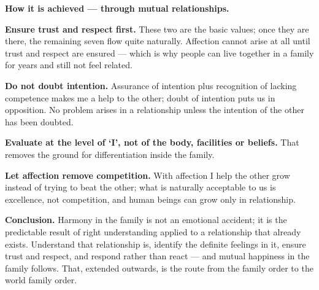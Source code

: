 \textbf{How it is achieved --- through mutual relationships.}

\begin{abul}
\item \textbf{Ensure trust and respect first.} These two are the basic values;
      once they are there, the remaining seven flow quite naturally. Affection
      cannot arise at all until trust and respect are ensured --- which is why
      people can live together in a family for years and still not feel
      related.
\item \textbf{Do not doubt intention.} Assurance of intention plus recognition
      of lacking competence makes me a help to the other; doubt of intention
      puts us in opposition. No problem arises in a relationship unless the
      intention of the other has been doubted.
\item \textbf{Evaluate at the level of `I', not of the body, facilities or
      beliefs.} That removes the ground for differentiation inside the family.
\item \textbf{Let affection remove competition.} With affection I help the
      other grow instead of trying to beat the other; what is naturally
      acceptable to us is excellence, not competition, and human beings can
      grow only in relationship.
\end{abul}

\textbf{Conclusion.} Harmony in the family is not an emotional accident; it is
the predictable result of right understanding applied to a relationship that
already exists. Understand that relationship is, identify the definite
feelings in it, ensure trust and respect, and respond rather than react ---
and mutual happiness in the family follows. That, extended outwards, is the
route from the family order to the world family order.
